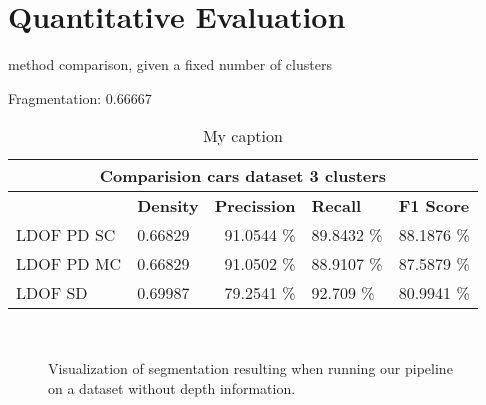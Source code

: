 \section{Quantitative Evaluation}



method comparison, given a fixed number of clusters


Fragmentation: 0.66667

\begin{table}[H]
\centering
\begin{tabular}{|l|l|r|l|l|}
\hline
\multicolumn{5}{|c|}{Comparision cars dataset 3 clusters}                        \\ \hline
              & \textbf{Density} & \textbf{Precission} & \textbf{Recall} & \textbf{F1 Score} \\ \hline
LDOF PD SC & 0.66829 & 91.0544 \%   & 89.8432 \%     & 88.1876 \%  \\ \hline
LDOF PD MC & 0.66829 & 91.0502 \%   & 88.9107 \%     & 87.5879 \%  \\ \hline              
LDOF SD & 0.69987 & 79.2541 \%   & 92.709 \%     & 80.9941 \%  \\ \hline
\end{tabular}
\caption[Cars Dataset]{My caption}
\label{tab:cars_ldof_quality}
\end{table}

\begin{figure}[H]
\begin{center}

~
\end{center}
\caption[Method Comparison]{Visualization of segmentation resulting when running our pipeline on a dataset without depth information.}
\label{fig:cars_dataset}
\end{figure}




